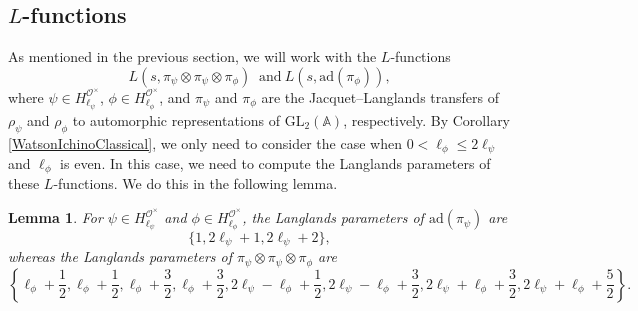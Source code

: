 \documentclass[11pt]{amsart}
\newtheorem{lemma}[theorem]{Lemma}
\theoremstyle{definition}
\begin{document}
\subsection{\texorpdfstring{$L$}{L}-functions}

As mentioned in the previous section, we will work with the $L$-functions $$ L(s,\pi_{\psi} \otimes \pi_{\psi} \otimes \pi_{\phi}) \: \text{ and} \: L(s,\mathrm{ad}(\pi_{\phi})),$$ where $\psi \in H_{\ell_{\psi}}^{\mathcal{O}^{\times}}$, $\phi \in H_{\ell_{\phi}}^{\mathcal{O}^{\times}}$, and $\pi_{\psi}$ and $\pi_{\phi}$ are the Jacquet--Langlands transfers of $\rho_{\psi}$ and $\rho_{\phi}$ to automorphic representations of $\mathrm{GL}_2(\mathbb{A})$, respectively. By Corollary \ref{WatsonIchinoClassical}, we only need to consider the case when $0< \ell_{\phi} \leq 2\ell_{\psi}$ and $\ell_{\phi}$ is even. In this case, we need to compute the Langlands parameters of these $L$-functions. We do this in the following lemma.

\begin{lemma}\label{LfuncsData}
For $\psi \in H_{\ell_{\psi}}^{\mathcal{O}^{\times}}$ and $\phi \in H_{\ell_{\phi}}^{\mathcal{O}^{\times}}$, the Langlands parameters of $\mathrm{ad}(\pi_{\psi})$ are $$\{1,2\ell_{\psi}+1, 2\ell_{\psi}+2\},$$ whereas the Langlands parameters of $\pi_{\psi} \otimes \pi_{\psi} \otimes \pi_{\phi}$ are $$ \left\{\ell_{\phi}+\frac{1}{2}, \ell_{\phi}+\frac{1}{2}, \ell_{\phi}+\frac{3}{2}, \ell_{\phi}+\frac{3}{2}, 2\ell_{\psi} - \ell_{\phi} + \frac{1}{2}, 2\ell_{\psi} - \ell_{\phi} + \frac{3}{2}, 2\ell_{\psi} + \ell_{\phi} + \frac{3}{2}, 2\ell_{\psi} + \ell_{\phi} + \frac{5}{2}\right\}.$$
\end{lemma}
\end{document}
